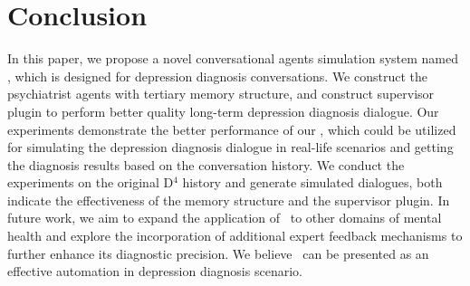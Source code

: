 \section{Conclusion}

In this paper, we propose a novel conversational agents simulation system named \system, which is designed for depression diagnosis conversations. We construct the psychiatrist agents with tertiary memory structure, and construct supervisor plugin to perform better quality long-term depression diagnosis dialogue. Our experiments demonstrate the better performance of our \system, which could be utilized for simulating the depression diagnosis dialogue in real-life scenarios and getting the diagnosis results based on the conversation history. We conduct the experiments on the original D$^4$ history and generate simulated dialogues, both indicate the effectiveness of the memory structure and the supervisor plugin. In future work, we aim to expand the application of \system~to other domains of mental health and explore the incorporation of additional expert feedback mechanisms to further enhance its diagnostic precision. We believe \system~can be presented as an effective automation in depression diagnosis scenario. 

